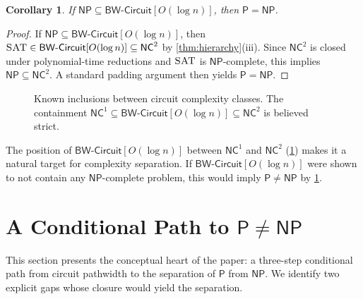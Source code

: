 \documentclass[11pt]{article}
\theoremstyle{plain}
\newtheorem{corollary}[theorem]{Corollary}
\theoremstyle{definition}
\newcommand{\SAT}{\textsc{SAT}}
\newcommand{\Pclass}{\mathsf{P}}
\newcommand{\NP}{\mathsf{NP}}
\newcommand{\NC}{\mathsf{NC}}
\newcommand{\AC}{\mathsf{AC}}
\newcommand{\BWCircuit}{\mathsf{BW\text{-}Circuit}}
\begin{document}
\begin{corollary}\label{cor:np-bw}
If $\NP \subseteq \BWCircuit[O(\log n)]$, then $\Pclass = \NP$.
\end{corollary}

\begin{proof}
If $\NP \subseteq \BWCircuit[O(\log n)]$, then $\SAT \in \BWCircuit[O(\log n)] \subseteq \NC^2$ by \cref{thm:hierarchy}(iii). Since $\NC^2$ is closed under polynomial-time reductions and $\SAT$ is $\NP$-complete, this implies $\NP \subseteq \NC^2$. A standard padding argument then yields $\Pclass = \NP$.
\end{proof}

\begin{figure}[htbp]
\centering
{}
\caption{Known inclusions between circuit complexity classes. The containment $\NC^1 \subseteq \BWCircuit[O(\log n)] \subseteq \NC^2$ is believed strict.}
\label{fig:hierarchy}
\end{figure}

The position of $\BWCircuit[O(\log n)]$ between $\NC^1$ and $\NC^2$ (\cref{fig:hierarchy}) makes it a natural target for complexity separation. If $\BWCircuit[O(\log n)]$ were shown to not contain any $\NP$-complete problem, this would imply $\Pclass \neq \NP$ by \cref{cor:np-bw}.


\section{A Conditional Path to $\Pclass \neq \NP$}\label{sec:conditional}

This section presents the conceptual heart of the paper: a three-step conditional path from circuit pathwidth to the separation of $\Pclass$ from $\NP$. We identify two explicit gaps whose closure would yield the separation.
\end{document}
